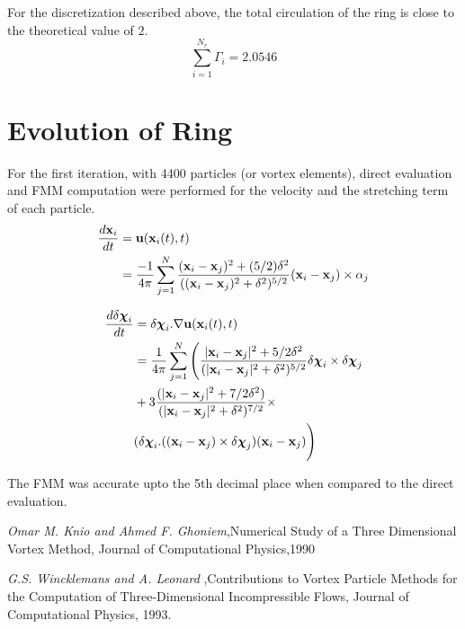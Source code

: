 \documentclass[10pt,a4paper]{report}
\newcommand{\xv}{{\bf x}}
\newcommand{\chiv}{{\boldsymbol \chi}}
\newcommand{\uv}{{\bf u}}
\begin{document}
For the discretization described above, the total circulation of the ring is close to the theoretical value of $2$.
\begin{equation}
\sum_{i=1}^{N_r} \Gamma_i = 2.0546 
\end{equation}

\section{Evolution of Ring}
For the first iteration, with 4400 particles (or vortex elements), direct evaluation and FMM computation were performed for the velocity and the stretching term of each particle.
\begin{align}
\frac{d\xv_i}{dt} &= \uv(\xv_i(t),t) \\
				&=  \frac{-1}{4\pi} \displaystyle \sum_{j=1}^{N} \frac{(\xv_i - \xv_j)^2 + (5/2) \delta^2}{((\xv_i - \xv_j)^2 + \delta^2)^{5/2}} (\xv_i - \xv_j) \times \alpha_j
\end{align}

\begin{align}
\frac{d\delta\chiv_i}{dt} &= \delta\chiv_i . \nabla \uv(\xv_i(t),t) \\
				&=  \frac{1}{4\pi} \displaystyle \sum_{j=1}^{N} \Bigg( \frac{|\xv_i - \xv_j|^2 + 5/2 \delta^2}{(|\xv_i - \xv_j|^2 + \delta^2)^{5/2}} \delta\chiv_i \times \delta\chiv_j \\
				&+ 3 \frac{(|\xv_i - \xv_j|^2 + 7/2 \delta^2)}{(|\xv_i - \xv_j|^2 + \delta^2)^{7/2}} \times \\
				&(\delta\chiv_i.((\xv_i - \xv_j)\times \delta\chiv_j)(\xv_i - \xv_j) \Bigg)
\end{align}

The FMM was accurate upto the 5th decimal place when compared to the direct evaluation. 

 







\begin{thebibliography}{3}
\emph{Omar M. Knio and Ahmed F. Ghoniem},Numerical Study of a Three Dimensional Vortex Method,
Journal of Computational Physics,1990

\emph{G.S. Wincklemans and A. Leonard}
,Contributions to Vortex Particle Methods for the Computation of Three-Dimensional Incompressible Flows,
Journal of Computational Physics, 1993.

\end{thebibliography}

 



 
\end{document}
